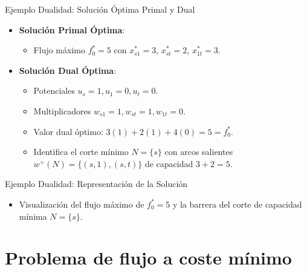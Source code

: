 \documentclass[
  ignorenonframetext,
]{beamer}
\providecommand{\tightlist}{%
  \setlength{\itemsep}{0pt}\setlength{\parskip}{0pt}}
\begin{document}
\begin{frame}{Ejemplo Dualidad: Solución Óptima Primal y Dual}
\label{ejemplo-dualidad-soluciuxf3n-uxf3ptima-primal-y-dual}
\begin{itemize}
\tightlist
\item
  \textbf{Solución Primal Óptima}:

  \begin{itemize}
  \tightlist
  \item
    Flujo máximo \(f_0^* = 5\) con \(x_{s1}^* = 3\), \(x_{st}^* = 2\),
    \(x_{1t}^* = 3\).
  \end{itemize}
\item
  \textbf{Solución Dual Óptima}:

  \begin{itemize}
  \tightlist
  \item
    Potenciales \(u_s = 1, u_1 = 0, u_t = 0\).
  \item
    Multiplicadores \(w_{s1} = 1, w_{st} = 1, w_{1t} = 0\).
  \item
    Valor dual óptimo: \(3(1) + 2(1) + 4(0) = 5 = f_0^*\).
  \item
    Identifica el corte mínimo \(N = \{s\}\) con arcos salientes
    \(w^+(N) = \{(s,1), (s,t)\}\) de capacidad \(3 + 2 = 5\).
  \end{itemize}
\end{itemize}
\end{frame}

\begin{frame}{Ejemplo Dualidad: Representación de la Solución}
\label{ejemplo-dualidad-representaciuxf3n-de-la-soluciuxf3n}
\begin{itemize}
\tightlist
\item
  Visualización del flujo máximo de \(f_0^* = 5\) y la barrera del corte
  de capacidad mínima \(N = \{s\}\).
\end{itemize}
\end{frame}

\section{Problema de flujo a coste
mínimo}\label{problema-de-flujo-a-coste-muxednimo}
\end{document}
